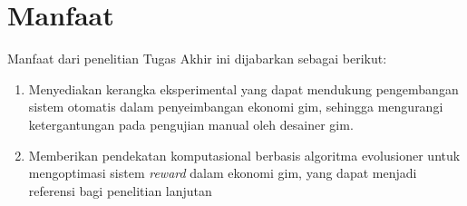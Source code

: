 \section{Manfaat}
\label{sec:benefit}

Manfaat dari penelitian Tugas Akhir ini dijabarkan sebagai berikut:

\begin{enumerate}
    \item Menyediakan kerangka eksperimental yang dapat mendukung pengembangan sistem otomatis dalam penyeimbangan ekonomi gim, sehingga mengurangi ketergantungan pada pengujian manual oleh desainer gim.
    \item Memberikan pendekatan komputasional berbasis algoritma evolusioner untuk mengoptimasi sistem \textit{reward} dalam ekonomi gim, yang dapat menjadi referensi bagi penelitian lanjutan
\end{enumerate}

    